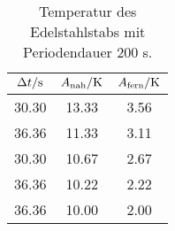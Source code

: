 \begin{table}

	\centering

	\caption{Temperatur des Edelstahlstabs mit Periodendauer 200 s.}


	\begin{tabular}{S[table-format=3.2] S[table-format=3.2]S[table-format=3.2]}

		\toprule

		{$\Delta t/\si[per-mode=reciprocal]{\second}$}&{$A_\text{nah}/\si[per-mode=reciprocal]{\kelvin}$}&{$A_\text{fern}/\si[per-mode=reciprocal]{\kelvin}$} \\

		\midrule

		30.30 & 13.33 & 3.56 \\

		36.36 & 11.33 & 3.11 \\

		30.30 & 10.67 & 2.67 \\

		36.36 & 10.22 & 2.22 \\

		36.36 & 10.00 & 2.00 \\

		\bottomrule

	\end{tabular}

	\label{tab:tab4}

\end{table}
